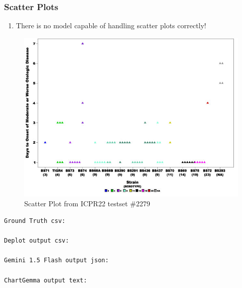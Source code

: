 \documentclass[
	letterpaper, %
]{jdf}
\begin{document}

\subsubsection{Scatter Plots}\label{sssect:scatter}
\begin{enumerate}
         \item There is no model capable of handling scatter plots correctly!
          \end{enumerate}
          \begin{figure}
               \includegraphics{test-sample/icpr22/images/scatter/PMC2279396___g002.jpg}
               \caption{Scatter Plot from ICPR22 testset \#2279}
               \label{fig:icpr22-scatter-2279}
                \end{figure}
\begin{verbatim}
Ground Truth csv:

Deplot output csv:

Gemini 1.5 Flash output json:

ChartGemma output text:

\end{verbatim}
\end{document}
